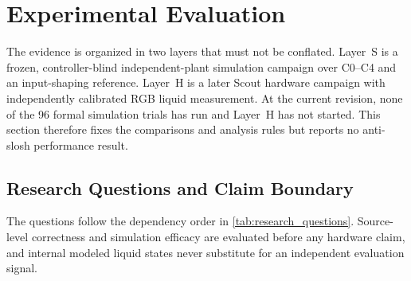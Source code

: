 \section{Experimental Evaluation}
\label{sec:experiments}

The evidence is organized in two layers that must not be conflated.  Layer~S
is a frozen, controller-blind independent-plant simulation campaign over
C0--C4 and an input-shaping reference.  Layer~H is a later Scout hardware
campaign with independently calibrated RGB liquid measurement.  At the current
revision, none of the 96 formal simulation trials has run and Layer~H has not
started.  This section therefore fixes the comparisons and analysis rules but
reports no anti-slosh performance result.

\subsection{Research Questions and Claim Boundary}

The questions follow the dependency order in
\cref{tab:research_questions}.  Source-level correctness and simulation
efficacy are evaluated before any hardware claim, and internal modeled liquid
states never substitute for an independent evaluation signal.

